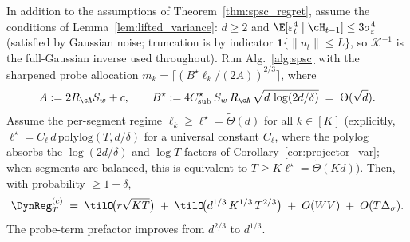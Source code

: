 \begin{theorem}
\label{thm:spsc_regret_sharp}
In addition to the assumptions of Theorem~\ref{thm:spsc_regret},
assume the conditions of Lemma~\ref{lem:lifted_variance}: $d\ge 2$
and $\E[\varepsilon_t^4\mid\cH_{t-1}]\le 3\sigma_\varepsilon^4$
(satisfied by Gaussian noise; truncation is by indicator
$\mathbf 1\{\|u_t\|\le L\}$, so $\mathcal K^{-1}$ is the full-Gaussian
inverse used throughout). Run Alg.~\ref{alg:spsc} with the sharpened
probe allocation $m_k = \lceil(B^\star\ell_k/(2A))^{2/3}\rceil$, where
\[
A := 2R_\cA S_w + c, \qquad
B^\star := 4 C_{\mathrm{sub}}^\star\,S_w\,R_\cA\,\sqrt{d\,\log(2d/\delta)}
\;=\;\Theta(\sqrt d).
\]
Assume the per-segment regime
$\ell_k\ge \ell^\star = \tilde\Theta(d)$ for all $k\in[K]$
(explicitly, $\ell^\star = C_\ell\,d\,\mathrm{polylog}(T,d/\delta)$
for a universal constant $C_\ell$, where the polylog absorbs the
$\log(2d/\delta)$ and $\log T$ factors of Corollary~\ref{cor:projector_var};
when segments are balanced, this is equivalent to
$T\ge K\ell^\star = \tilde\Theta(Kd)$).
Then, with probability $\ge 1-\delta$,
\begin{equation}
\DynReg_T^{(c)}
\;=\;\tilO\!\bigl(r\sqrt{KT}\bigr)
\;+\;\tilO\!\bigl(d^{1/3}\,K^{1/3}\,T^{2/3}\bigr)
\;+\;O(WV)\;+\;O(T\Delta_\sigma).
\label{eq:main_bound_sharp}
\end{equation}
The probe-term prefactor improves from $d^{2/3}$ to $d^{1/3}$.
\end{theorem}
